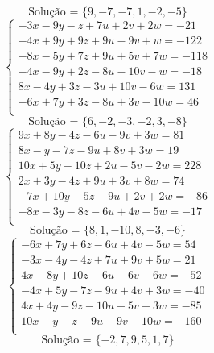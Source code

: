 \documentclass[12pt,oneside,a4paper]{article}
\begin{document}
\begin{equation*}
\text{Solução = }\{9,-7,-7,1,-2,-5\}
\end{equation*}
\vspace{\baselineskip}
\begin{equation*}
\begin{cases}
-3x-9y-z+7u+2v+2w=-21 \\
-4x+9y+9z+9u-9v+w=-122 \\
-8x-5y+7z+9u+5v+7w=-118 \\
-4x-9y+2z-8u-10v-w=-18 \\
8x-4y+3z-3u+10v-6w=131 \\
-6x+7y+3z-8u+3v-10w=46 \\
\end{cases}
\end{equation*}
\begin{equation*}
\text{Solução = }\{6,-2,-3,-2,3,-8\}
\end{equation*}
\vspace{\baselineskip}
\begin{equation*}
\begin{cases}
9x+8y-4z-6u-9v+3w=81 \\
8x-y-7z-9u+8v+3w=19 \\
10x+5y-10z+2u-5v-2w=228 \\
2x+3y-4z+9u+3v+8w=74 \\
-7x+10y-5z-9u+2v+2w=-86 \\
-8x-3y-8z-6u+4v-5w=-17 \\
\end{cases}
\end{equation*}
\begin{equation*}
\text{Solução = }\{8,1,-10,8,-3,-6\}
\end{equation*}
\vspace{\baselineskip}
\begin{equation*}
\begin{cases}
-6x+7y+6z-6u+4v-5w=54 \\
-3x-4y-4z+7u+9v+5w=21 \\
4x-8y+10z-6u-6v-6w=-52 \\
-4x+5y-7z-9u+4v+3w=-40 \\
4x+4y-9z-10u+5v+3w=-85 \\
10x-y-z-9u-9v-10w=-160 \\
\end{cases}
\end{equation*}
\begin{equation*}
\text{Solução = }\{-2,7,9,5,1,7\}
\end{equation*}
\end{document}
